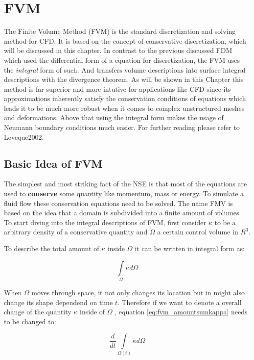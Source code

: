 \section{FVM}

The Finite Volume Method (FVM) is the standard discretization and solving method for 
CFD. It is based on the concept of conservative discretization, which will be discussed in this chapter. In contrast to the previous discussed FDM which used the differential form of a equation for discretization, the FVM uses the \emph{integral} form of such. And transfers volume descriptions into surface integral descriptions with the divergence theorem. As will be shown in this Chapter this method is far superior and more intutive for applications like CFD since its approximations inherently satisfy the conservation conditions of equations which leads it to be much more robust when it comes to complex unstructured meshes and deformations. Above that using the integral form makes the usage of Neumann boundary conditions much easier. For further reading please refer to Leveque2002.


\subsection{Basic Idea of FVM}
The simplest and most striking fact of the NSE is that most of the equations are used to \textbf{conserve} some quantity like momentum, mass or energy. To simulate a fluid flow these conservation equations need to be solved. The name FMV is based on the idea that a domain is subdivided into a finite amount of volumes. To start diving into the integral descriptions of FVM, first consider $ \kappa $ to be a arbitrary density of a conservative quantity and $\Omega$ a certain control volume in $R^3$.   

To describe the total amount of $\kappa$ inside $\Omega$ it can be written in integral form as:

\begin{equation}\label{eq:fvm_amountsumkappa}
\int\limits_{\Omega} \kappa d \Omega
\end{equation}



When $\Omega$ moves through space, it not only changes its location but in might also change its shape dependend on time $t$. Therefore if we want to denote a overall change of the quantity $\kappa$ inside of $\Omega$ ,  equation \ref{eq:fvm_amountsumkappa} needs to be changed to:

\begin{equation}\label{eq:fvm_amountsumkappa_deptime}
\frac {d}{dt} \int\limits_{\Omega (t)} \kappa d \Omega
\end{equation}


